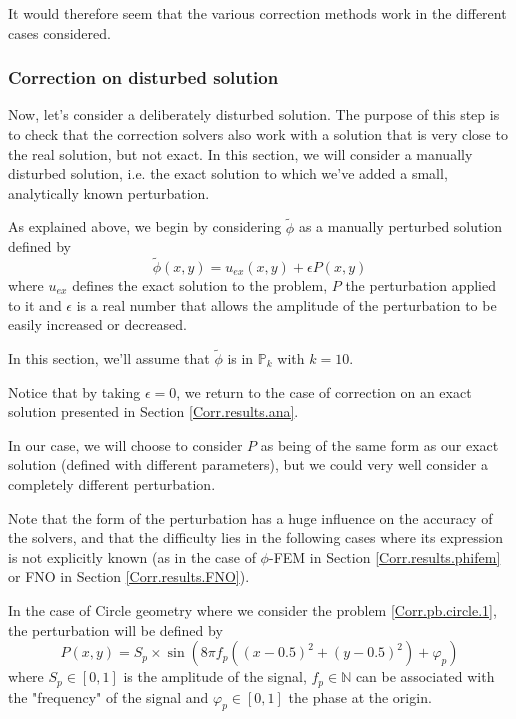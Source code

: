 It would therefore seem that the various correction methods work in the different cases considered.

\subsubsection{Correction on disturbed solution} \label{Corr.results.disturbed}

Now, let's consider a deliberately disturbed solution. The purpose of this step is to check that the correction solvers also work with a solution that is very close to the real solution, but not exact. In this section, we will consider a manually disturbed solution, i.e. the exact solution to which we've added a small, analytically known perturbation.

As explained above, we begin by considering $\tilde{\phi}$ as a manually perturbed solution defined by
\begin{equation*}
	\tilde{\phi}(x,y)=u_{ex}(x,y)+\epsilon P(x,y)
\end{equation*}
where $u_{ex}$ defines the exact solution to the problem, $P$ the perturbation applied to it and $\epsilon$ is a real number that allows the amplitude of the perturbation to be easily increased or decreased. 

In this section, we'll assume that $\tilde{\phi}$ is in $\mathbb{P}_k$ with $k=10$.

\begin{Rem}
	Notice that by taking $\epsilon=0$, we return to the case of correction on an exact solution presented in Section \ref{Corr.results.ana}. 
\end{Rem}

In our case, we will choose to consider $P$ as being of the same form as our exact solution (defined with different parameters), but we could very well consider a completely different perturbation. 

\begin{Rem}
	Note that the form of the perturbation has a huge influence on the accuracy of the solvers, and that the difficulty lies in the following cases where its expression is not explicitly known (as in the case of $\phi$-FEM in Section \ref{Corr.results.phifem} or FNO in Section \ref{Corr.results.FNO}).
\end{Rem}

In the case of Circle geometry where we consider the problem \ref{Corr.pb.circle.1}, the perturbation will be defined by
\begin{equation*}
	P(x,y)=S_p\times\sin\left(8\pi f_p\left((x-0.5)^2+(y-0.5)^2\right)+\varphi_p\right)
\end{equation*}
where $S_p\in[0,1]$ is the amplitude of the signal, $f_p\in\mathbb{N}$ can be associated with the "frequency" of the signal and $\varphi_p\in[0,1]$ the phase at the origin.

